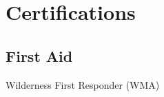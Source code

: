 \documentclass[letterpaper]{deedy-resume} %
\begin{document}
\begin{minipage}[t]{0.33\textwidth}
\sectionspace %


\section{Certifications} 
\subsection{First Aid}
Wilderness First Responder (WMA) \\

\sectionspace %


\end{minipage} %
\hfill
%
%
\end{document}
